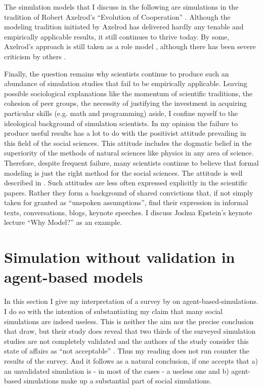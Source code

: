 \documentclass[12pt, english, a4paper]{article}
\begin{document}
The simulation models that I discuss in the following are simulations
in the tradition of Robert Axelrod’s “Evolution of Cooperation”
\citep{axelrod:1984}. Although the modeling tradition initiated by
Axelrod has delivered hardly any tenable and empirically applicable
results, it still continues to thrive today. By some, Axelrod’s
approach is still taken as a role model
\citep[208-209]{rendell-et-al:2010a}, although there has been severe
criticism by others \citep{arnold:2008, binmore:1994, binmore:1998}.

Finally, the question remains why scientists continue to produce such
an abundance of simulation studies that fail to be empirically
applicable. Leaving possible sociological explanations like the
momentum of scientific traditions, the cohesion of peer groups, the
necessity of justifying the investment in acquiring particular skills
(e.g. math and programming) aside, I confine myself to the ideological
background of simulation scientists. In my opinion the failure to
produce useful results has a lot to do with the positivist attitude
prevailing in this field of the social sciences. This attitude
includes the dogmatic belief in the superiority of the methods of
natural sciences like physics in any area of science. Therefore,
despite frequent failure, many scientists continue to believe that
formal modeling is just the right method for the social sciences. The
attitude is well described in \citet{shapiro:2005}. Such attitudes are
less often expressed explicitly in the scientific papers. Rather they
form a background of shared convictions that, if not simply taken for
granted as “unspoken assumptions”, find their expression in informal
texts, conversations, blogs, keynote speeches. I discuss Joshua
Epstein’s keynote lecture “Why Model?” \citep{epstein:2008} as an
example.


\section{Simulation without validation in agent-based models}

In this section I give my interpretation of a survey by
\citet{heath-et-al:2009} on agent-based-simulations. I do so with the
intention of substantiating my claim that many social simulations are
indeed useless. This is neither the aim nor the precise conclusion
that \citet{heath-et-al:2009} draw, but their study does reveal that
two thirds of the surveyed simulation studies are not completely
validated and the authors of the study consider this state of affairs
as ``not acceptable'' \citep[4.11]{heath-et-al:2009}. Thus my reading
does not run counter the results of the survey. And it follows as a
natural conclusion, if one accepts that a) an unvalidated simulation
is - in most of the cases - a useless one and b) agent-based
simulations make up a substantial part of social simulations.
\end{document}
